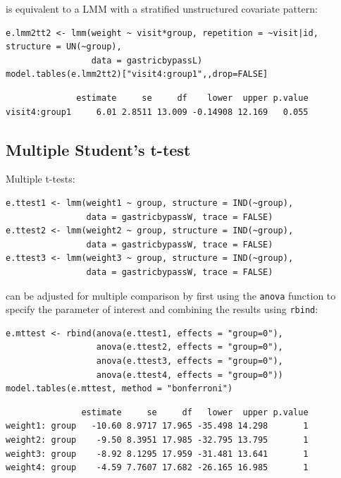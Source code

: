 \documentclass[12pt]{article}
\begin{document}
is equivalent to a LMM with a stratified unstructured covariate pattern:
\lstset{language=r,label= ,caption= ,captionpos=b,numbers=none}
\begin{lstlisting}
e.lmm2tt2 <- lmm(weight ~ visit*group, repetition = ~visit|id, structure = UN(~group),
                 data = gastricbypassL)
model.tables(e.lmm2tt2)["visit4:group1",,drop=FALSE]
\end{lstlisting}

\begin{verbatim}
              estimate     se     df    lower  upper p.value
visit4:group1     6.01 2.8511 13.009 -0.14908 12.169   0.055
\end{verbatim}


\clearpage

\subsection{Multiple Student's t-test}
\label{sec:org4ce137a}


Multiple t-tests:
\lstset{language=r,label= ,caption= ,captionpos=b,numbers=none}
\begin{lstlisting}
e.ttest1 <- lmm(weight1 ~ group, structure = IND(~group), 
                data = gastricbypassW, trace = FALSE)
e.ttest2 <- lmm(weight2 ~ group, structure = IND(~group), 
                data = gastricbypassW, trace = FALSE)
e.ttest3 <- lmm(weight3 ~ group, structure = IND(~group), 
                data = gastricbypassW, trace = FALSE)
\end{lstlisting}

can be adjusted for multiple comparison by first using the \texttt{anova}
function to specify the parameter of interest and combining the
results using \texttt{rbind}:
\lstset{language=r,label= ,caption= ,captionpos=b,numbers=none}
\begin{lstlisting}
e.mttest <- rbind(anova(e.ttest1, effects = "group=0"),
                  anova(e.ttest2, effects = "group=0"),
                  anova(e.ttest3, effects = "group=0"),
                  anova(e.ttest4, effects = "group=0"))
model.tables(e.mttest, method = "bonferroni")
\end{lstlisting}

\begin{verbatim}
               estimate     se     df   lower  upper p.value
weight1: group   -10.60 8.9717 17.965 -35.498 14.298       1
weight2: group    -9.50 8.3951 17.985 -32.795 13.795       1
weight3: group    -8.92 8.1295 17.959 -31.481 13.641       1
weight4: group    -4.59 7.7607 17.682 -26.165 16.985       1
\end{verbatim}
\end{document}
